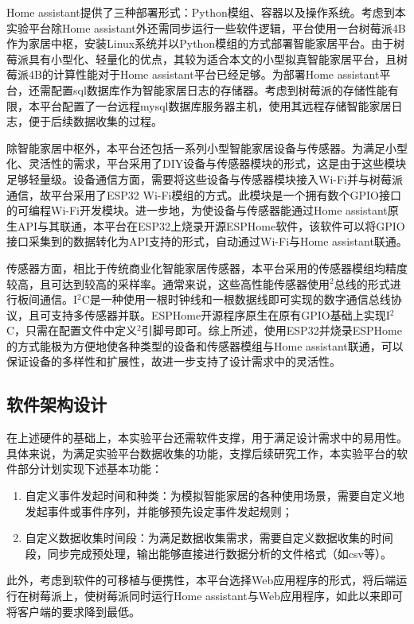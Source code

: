 Home assistant提供了三种部署形式：Python模组、容器以及操作系统。考虑到本实验平台除Home assistant外还需同步运行一些软件逻辑，平台使用一台树莓派4B作为家居中枢，安装Linux系统并以Python模组的方式部署智能家居平台。由于树莓派具有小型化、轻量化的优点，其较为适合本文的小型拟真智能家居平台，且树莓派4B的计算性能对于Home assistant平台已经足够。为部署Home assistant平台，还需配置sql数据库作为智能家居日志的存储器。考虑到树莓派的存储性能有限，本平台配置了一台远程mysql数据库服务器主机，使用其远程存储智能家居日志，便于后续数据收集的过程。

除智能家居中枢外，本平台还包括一系列小型智能家居设备与传感器。为满足小型化、灵活性的需求，平台采用了DIY设备与传感器模块的形式，这是由于这些模块足够轻量级。设备通信方面，需要将这些设备与传感器模块接入Wi-Fi并与树莓派通信，故平台采用了ESP32 Wi-Fi模组的方式。此模块是一个拥有数个GPIO接口的可编程Wi-Fi开发模块。进一步地，为使设备与传感器能通过Home assistant原生API与其联通，本平台在ESP32上烧录开源ESPHome软件，该软件可以将GPIO接口采集到的数据转化为API支持的形式，自动通过Wi-Fi与Home assistant联通。

传感器方面，相比于传统商业化智能家居传感器，本平台采用的传感器模组均精度较高，且可达到较高的采样率。通常来说，这些高性能传感器使用$^2$总线的形式进行板间通信。I$^2$C是一种使用一根时钟线和一根数据线即可实现的数字通信总线协议，且可支持多传感器并联。ESPHome开源程序原生在原有GPIO基础上实现I$^2$C，只需在配置文件中定义$^2$引脚号即可。综上所述，使用ESP32并烧录ESPHome的方式能极为方便地使各种类型的设备和传感器模组与Home assistant联通，可以保证设备的多样性和扩展性，故进一步支持了设计需求中的灵活性。

\subsection{软件架构设计}

在上述硬件的基础上，本实验平台还需软件支撑，用于满足设计需求中的易用性。具体来说，为满足实验平台数据收集的功能，支撑后续研究工作，本实验平台的软件部分计划实现下述基本功能：

\begin{enumerate}
	\item 自定义事件发起时间和种类：为模拟智能家居的各种使用场景，需要自定义地发起事件或事件序列，并能够预先设定事件发起规则；
	\item 自定义数据收集时间段：为满足数据收集需求，需要自定义数据收集的时间段，同步完成预处理，输出能够直接进行数据分析的文件格式（如csv等）。
\end{enumerate}

此外，考虑到软件的可移植与便携性，本平台选择Web应用程序的形式，将后端运行在树莓派上，使树莓派同时运行Home assistant与Web应用程序，如此以来即可将客户端的要求降到最低。

